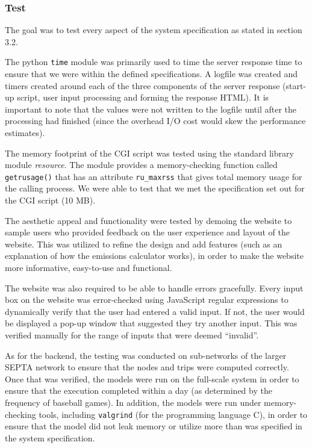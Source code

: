 
\subsubsection{Test}
The goal was to test every aspect of the system specification as
stated in section 3.2.

The python \texttt{time} module was primarily used to time the server
response time to ensure that we were within the defined
specifications.  A logfile was created and timers created around each
of the three components of the server response (start-up script, user
input processing and forming the response HTML). It is important to
note that the values were not written to the logfile until after the
processing had finished (since the overhead I/O cost would skew the
performance estimates).

The memory footprint of the CGI script was tested using the standard
library module \emph{resource}. The module provides a memory-checking
function called \texttt{getrusage()} \cite{php-memory} that has an
attribute \verb|ru_maxrss| that gives total memory usage for the
calling process. We were able to test that we met the specification
set out for the CGI script (10 MB).

The aesthetic appeal and functionality were tested by demoing the
website to sample users who provided feedback on the user experience
and layout of the website. This was utilized to refine the design and
add features (such as an explanation of how the emissions calculator
works), in order to make the website more informative, easy-to-use and
functional.

The website was also required to be able to handle errors
gracefully. Every input box on the website was error-checked using
JavaScript regular expressions to dynamically verify that the user had
entered a valid input. If not, the user would be displayed a pop-up
window that suggested they try another input. This was verified
manually for the range of inputs that were deemed ``invalid''.

As for the backend, the testing was conducted on sub-networks of the
larger SEPTA network to ensure that the nodes and trips were computed
correctly. Once that was verified, the models were run on the
full-scale system in order to ensure that the execution completed
within a day (as determined by the frequency of baseball games). In
addition, the models were run under memory-checking tools, including
\texttt{valgrind} (for the programming language C), in order to ensure
that the model did not leak memory or utilize more than was specified
in the system specification.

